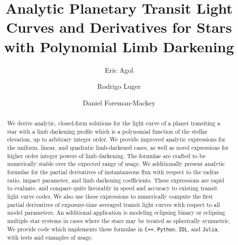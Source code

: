 \documentclass[modern,trackchanges]{aastex63}
\begin{document}

\setlength{\abovedisplayskip}{1.5em}
\setlength{\belowdisplayskip}{1.5em}

\title{%
Analytic Planetary Transit Light Curves and Derivatives for Stars with Polynomial Limb Darkening
}


\author[0000-0002-0802-9145]{Eric Agol}
\author[0000-0002-0296-3826]{Rodrigo Luger}
\author[0000-0002-9328-5652]{Daniel Foreman-Mackey}


\begin{abstract}
We derive analytic, closed-form solutions for the light curve of a planet
transiting a star with a limb darkening profile which is a polynomial function
of the stellar elevation, up to arbitrary integer order.
We provide improved analytic expressions for the uniform, linear, and quadratic
limb-darkened cases, as well as novel expressions for higher order integer powers
of limb darkening.  The formulae are crafted to be numerically stable over the
expected range of usage.  We additionally present analytic formulae for
the partial derivatives of instantaneous flux with respect to the radius ratio,
impact parameter, and limb darkening coefficients.  These expressions are rapid to
evaluate, and compare quite favorably in speed and accuracy to existing transit light
curve codes. We also use these expressions to numerically compute the first partial
derivatives of exposure-time averaged transit light curves with respect to all
model parameters.  An additional application is modeling eclipsing binary or
eclipsing multiple star systems in cases where the stars may be treated as spherically
symmetric.  We provide code which implements these formulae in \texttt{C++}, 
\texttt{Python}, \texttt{IDL}, and \texttt{Julia},
with tests and examples of usage.
 \href{https://github.com/rodluger/Limbdark.jl}{\color{linkcolor}\faGithub}
\end{abstract}

%
\end{document}
